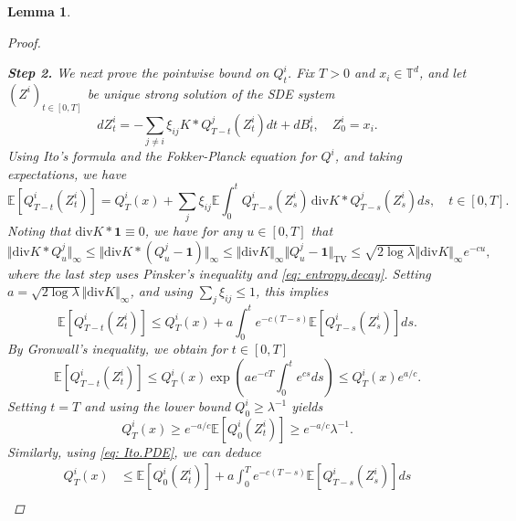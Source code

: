 \documentclass[11pt,reqno]{amsart}
\numberwithin{equation}{section}
\newtheorem{lemma}[theorem]{Lemma}
\theoremstyle{definition}
\def\diver{\mathrm{div}}
\def\E{{\mathbb E}}
\def\T{{\mathbb T}}
\begin{document}
\begin{lemma}
\begin{proof}
	 { \ }
	 
	 	 \noindent\textbf{Step 2.}
		We next prove the pointwise bound on $Q^i_t$. Fix $T > 0$ and $x_i \in \T^d$, and let $(Z^i)_{t \in [0,T]}$ be unique strong solution of the SDE system
		\begin{equation*}
			d Z^{i}_t = -\sum_{j \neq i} \xi_{ij} K \ast Q^{j}_{T - t} (Z^{i}_t) dt + dB^i_t, \quad Z^{i}_0 = x_i.
		\end{equation*}
		Using Ito's formula and the Fokker-Planck equation for $Q^i$, and taking expectations, we have
		\begin{equation} \label{eq: Ito.PDE}
			\E \left[Q^{i}_{T-t}(Z^{i}_t)\right] = Q^i_T(x) + \sum_{j} \xi_{ij} \E \int_0^t Q^{i}_{T-s}(Z^{i}_s) \,  \diver K \ast Q^{j}_{T-s}(Z^{i}_s) ds, \quad t \in [0,T].
		\end{equation}
		Noting that $ \diver K \ast \mathbf{1} \equiv 0 $, we have for any $ u \in [0,T] $ that 
		\begin{equation*}
			\Vert \diver K \ast Q^{j}_u \Vert_\infty \le \Vert \diver K \ast (Q^{j}_u - \mathbf{1}) \Vert_\infty \le \Vert \diver K \Vert_\infty \Vert Q^{j}_u - \mathbf{1} \Vert_{\text{TV}} \le \sqrt{2 \log \lambda} \Vert \diver K \Vert_\infty e^{-c u},
		\end{equation*}
		where the last step uses Pinsker's inequality and \eqref{eq: entropy.decay}. Setting $ a = \sqrt{2 \log \lambda} \Vert \diver K \Vert_\infty  $, and using $\sum_j \xi_{ij} \le 1$, this implies
		\begin{equation*}
			\E \left[Q^{i}_{T-t}(Z^{i}_t)\right] \le Q^i_T(x) + a \int_0^t e^{-c (T - s)} \E \left[Q^{i}_{T-s}(Z^{i}_s)\right]  ds .
		\end{equation*}
		By  Gronwall's inequality, we obtain for $t \in [0,T]$
		\begin{equation*}
			\E \left[Q^{i}_{T-t}(Z^{i}_t)\right] \le Q_T^i(x) \exp \left(a e^{-cT}  \int_0^t e^{cs} ds\right) \le Q_T^i(x) e^{a/c}.
		\end{equation*}
		Setting $t = T$ and using the lower bound $Q^i_0 \ge \lambda^{-1}$ yields 
		\begin{equation*}
			Q_T^{i}(x)  \ge e^{-a/c}	\E \left[Q^{i}_{0}(Z^{i}_t)\right]   \ge e^{-a/c}\lambda^{-1}.
		\end{equation*}
		Similarly, using \eqref{eq: Ito.PDE}, we can deduce 
		\begin{align*}
			Q^{i}_T(x) &\le \E \left[Q^{i}_{0}(Z^{i}_t)\right]  + a  \int_0^T e^{-c (T - s)}    \E[Q^{i}_{T - s}(Z^{i}_s)] ds \\

\end{align*}
\end{proof}
\end{lemma}
\end{document}
